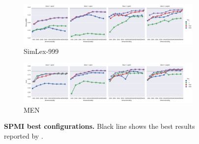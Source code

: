 \begin{figure}
  \centering
  \begin{subfigure}[b]{\textwidth}
    \includegraphics[width=\textwidth]{supplement/figures/SimLex999-best}
    \caption{SimLex-999}
    \label{fig:simlex-ppmi-best-simlex}
  \end{subfigure}


  \begin{subfigure}[b]{\textwidth}
    \includegraphics[width=\textwidth]{supplement/figures/men-best}
    \caption{MEN}
    \label{fig:simlex-ppmi-best-men}
  \end{subfigure}

  \caption{\textbf{SPMI best configurations.} Black line shows the best results reported by \protect{}.}
  \label{fig:simlex-ppmi-best}
\end{figure}

